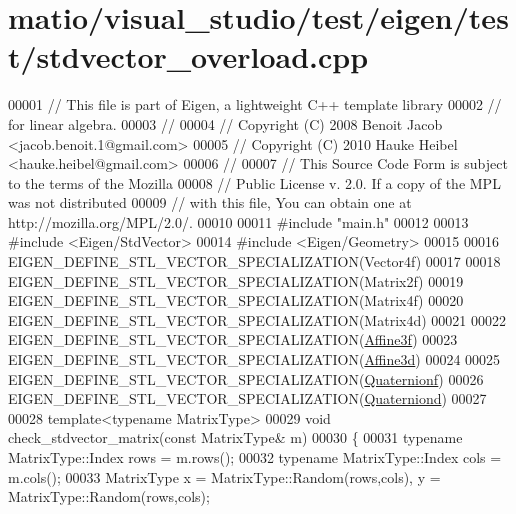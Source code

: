\hypertarget{matio_2visual__studio_2test_2eigen_2test_2stdvector__overload_8cpp_source}{}\section{matio/visual\+\_\+studio/test/eigen/test/stdvector\+\_\+overload.cpp}
\label{matio_2visual__studio_2test_2eigen_2test_2stdvector__overload_8cpp_source}

\begin{DoxyCode}
00001 \textcolor{comment}{// This file is part of Eigen, a lightweight C++ template library}
00002 \textcolor{comment}{// for linear algebra.}
00003 \textcolor{comment}{//}
00004 \textcolor{comment}{// Copyright (C) 2008 Benoit Jacob <jacob.benoit.1@gmail.com>}
00005 \textcolor{comment}{// Copyright (C) 2010 Hauke Heibel <hauke.heibel@gmail.com>}
00006 \textcolor{comment}{//}
00007 \textcolor{comment}{// This Source Code Form is subject to the terms of the Mozilla}
00008 \textcolor{comment}{// Public License v. 2.0. If a copy of the MPL was not distributed}
00009 \textcolor{comment}{// with this file, You can obtain one at http://mozilla.org/MPL/2.0/.}
00010 
00011 \textcolor{preprocessor}{#include "main.h"}
00012 
00013 \textcolor{preprocessor}{#include <Eigen/StdVector>}
00014 \textcolor{preprocessor}{#include <Eigen/Geometry>}
00015 
00016 EIGEN\_DEFINE\_STL\_VECTOR\_SPECIALIZATION(Vector4f)
00017 
00018 EIGEN\_DEFINE\_STL\_VECTOR\_SPECIALIZATION(Matrix2f)
00019 EIGEN\_DEFINE\_STL\_VECTOR\_SPECIALIZATION(Matrix4f)
00020 EIGEN\_DEFINE\_STL\_VECTOR\_SPECIALIZATION(Matrix4d)
00021 
00022 EIGEN\_DEFINE\_STL\_VECTOR\_SPECIALIZATION(\hyperlink{group___geometry___module_class_eigen_1_1_transform}{Affine3f})
00023 EIGEN\_DEFINE\_STL\_VECTOR\_SPECIALIZATION(\hyperlink{group___geometry___module_class_eigen_1_1_transform}{Affine3d})
00024 
00025 EIGEN\_DEFINE\_STL\_VECTOR\_SPECIALIZATION(\hyperlink{group___geometry___module_class_eigen_1_1_quaternion}{Quaternionf})
00026 EIGEN\_DEFINE\_STL\_VECTOR\_SPECIALIZATION(\hyperlink{group___geometry___module_class_eigen_1_1_quaternion}{Quaterniond})
00027 
00028 \textcolor{keyword}{template}<\textcolor{keyword}{typename} MatrixType>
00029 \textcolor{keywordtype}{void} check\_stdvector\_matrix(\textcolor{keyword}{const} MatrixType& m)
00030 \{
00031   \textcolor{keyword}{typename} MatrixType::Index rows = m.rows();
00032   \textcolor{keyword}{typename} MatrixType::Index cols = m.cols();
00033   MatrixType x = MatrixType::Random(rows,cols), y = MatrixType::Random(rows,cols);

\end{DoxyCode}

